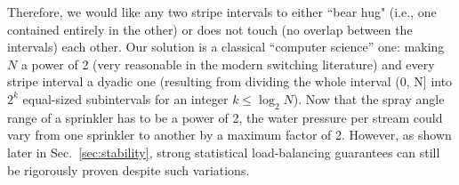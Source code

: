 Therefore, we would like any two stripe intervals to either ``bear hug"
(i.e., one contained entirely in the other) or does not touch (no overlap between the intervals) 
each other.  Our solution is a classical ``computer science'' one: making $N$ a power of 2 (very reasonable 
in the modern switching literature) and every stripe interval a dyadic one (resulting from dividing the 
whole interval (0, N] into $2^k$ equal-sized subintervals for an integer $k \le \log_2 N$).  
Now that the spray angle range of a sprinkler has 
to be a power of 2, the water pressure per stream could vary from one sprinkler to another by a maximum factor of 2.  
However, as shown later in Sec.~\ref{sec:stability},
strong statistical load-balancing guarantees can still be rigorously proven
despite such variations.



\begin{comment}
We will show this coordination can be mathematically characterized as an Orthogonal Latin Square (OLS).  
While how to generate a (strongly) random OLS has been an open problem in combinatorics and theoretical computer science for 
decades, we fortunately are able to circumvent it, because Sprinklers will provably work with 
a weakly random (defined later) OLS, which is 
straightforward to generate.
\end{comment}

 




\begin{comment}
With near-perfect load-balancing, a Sprinklers switch pays only a modest price for guaranteeing correct packet
order.   While all other load-balanced switching solutions can guarantee 100\% throughput, the achievable throughput of our approach
is slightly less than 100\%.
For example, in a $2048 \times 2048$ switch, it can be rigorously proven that our solutions can 
achieve a throughput of about 95\% with high probability; see Table~\ref{tbl:example of bounds} in 
Sec.~\ref{sec:stability} for details.  And since there are slacks in the involved
mathematical inequalities, the actual achievable throughput is likely much closer to 100\%.   

Moreover, we will show that the provably achievable throughput of our solutions approaches
100\% asymptotically as the size of the switch $N$ increases.
This is because the load balancing capability of our solution, closely related to its throughput guarantee, 
builds upon the statistical multiplexing of flows that come from 
different input ports going to different output ports, in any intermediate ports, and this statistical multiplexing gain
grows with the number of input/output ports.  
We will show that, compared with existing load-balanced switching solutions,
each of which has to pay in one way or another for guaranteeing packet ordering,
the price paid by our solution, namely a few percent in throughput, appears to be the lowest.
\end{comment}











